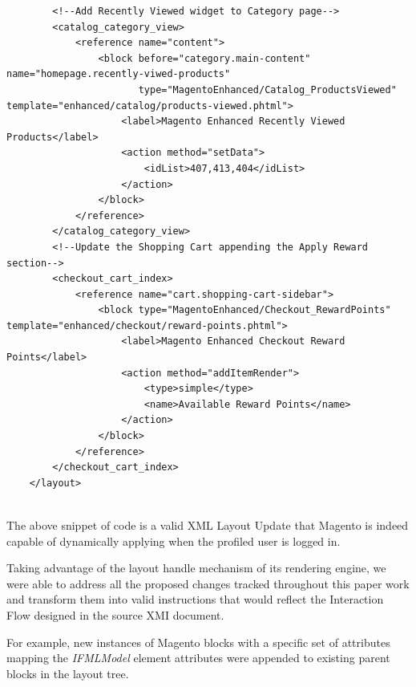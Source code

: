 \begin{lstlisting}
        <!--Add Recently Viewed widget to Category page-->
        <catalog_category_view>
            <reference name="content">
                <block before="category.main-content" name="homepage.recently-viwed-products"
                       type="MagentoEnhanced/Catalog_ProductsViewed" template="enhanced/catalog/products-viewed.phtml">
                    <label>Magento Enhanced Recently Viewed Products</label>
                    <action method="setData">
                        <idList>407,413,404</idList>
                    </action>
                </block>
            </reference>
        </catalog_category_view>
        <!--Update the Shopping Cart appending the Apply Reward section-->
        <checkout_cart_index>
            <reference name="cart.shopping-cart-sidebar">
                <block type="MagentoEnhanced/Checkout_RewardPoints" template="enhanced/checkout/reward-points.phtml">
                    <label>Magento Enhanced Checkout Reward Points</label>
                    <action method="addItemRender">
                        <type>simple</type>
                        <name>Available Reward Points</name>
                    </action>
                </block>
            </reference>
        </checkout_cart_index>
    </layout>
    
\end{lstlisting}
\vspace{0.5cm}

The above snippet of code is a valid XML Layout Update that Magento is indeed capable of dynamically applying when the profiled user is logged in.

Taking advantage of the layout handle mechanism of its rendering engine, we were able to address all the proposed changes tracked throughout this paper work and transform them into valid instructions that would reflect the Interaction Flow designed in the source XMI document. 

For example, new instances of Magento blocks with a specific set of attributes mapping the \textit{IFMLModel} element attributes were appended to existing parent blocks in the layout tree. 

